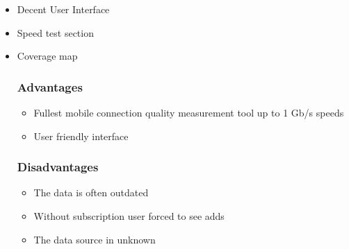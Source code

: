\begin{itemize}
    \renewcommand\labelitemi{\textbf{\Huge .}}
    \item  Decent User Interface
    \item  Speed test section
    \item Coverage map 
  
\subsubsection*{Advantages}
\begin{itemize}
\renewcommand\labelitemi{\textbf{\Huge .}}
    \item Fullest mobile connection quality measurement tool up to 1 Gb/s speeds
    \item User friendly interface
\end{itemize} 

\subsubsection*{Disadvantages}
\begin{itemize}
\renewcommand\labelitemi{\textbf{\Huge .}}
    \item The data is often outdated 
    \item Without subscription user forced to see adds
    \item The data source in unknown
\end{itemize} 
\end{itemize}

